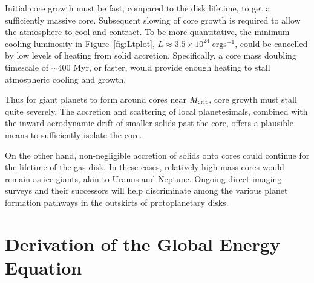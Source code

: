 \documentclass[apj, numberedappendix]{emulateapj}
\newcommand{\Fig}[1]{Figure~\ref{#1}}
\newcommand{\MC}{M_{\rm crit}}
\begin{document}
Initial core growth must be fast, compared to the disk lifetime, to get a sufficiently massive core.  Subsequent slowing of core growth is required to allow the atmosphere to cool and contract.  To be more quantitative, the minimum cooling luminosity in \Fig{fig:Ltplot}, $L\approx 3.5 \times 10^{24}\;\mathrm{erg s}^{-1}$, could be cancelled by low levels of heating from solid accretion.  Specifically, a core mass doubling timescale of $\sim$$400$ Myr, or faster, would provide enough heating to stall atmospheric cooling and growth.  

Thus for giant planets to form around cores near $\MC$, core growth must stall quite severely.   The accretion and scattering of local planetesimals, combined with the inward aerodynamic drift of smaller solids past the core, offers a plausible means to sufficiently isolate the core.  

On the other hand, non-negligible accretion of solids onto cores could continue for the lifetime of the gas disk.  In these cases, relatively high mass cores would remain as ice giants, akin to Uranus and Neptune.   Ongoing direct imaging surveys and their successors \citep{hinz12, macintosh12} will help discriminate among the various planet formation pathways in the outskirts of protoplanetary disks.







\appendix
\section{Derivation of the Global Energy Equation}\label{sec:globalderiv}
\end{document}
